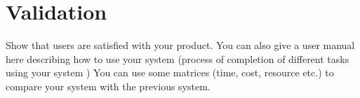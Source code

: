 \section{Validation} \label{sec:val}
Show that users are satisfied with your product. 
You can also give a user manual here describing how to use your system (process of completion of different tasks using your system )
You can use some matrices (time, cost, resource etc.) to compare your system with the previous system. 
\clearpage